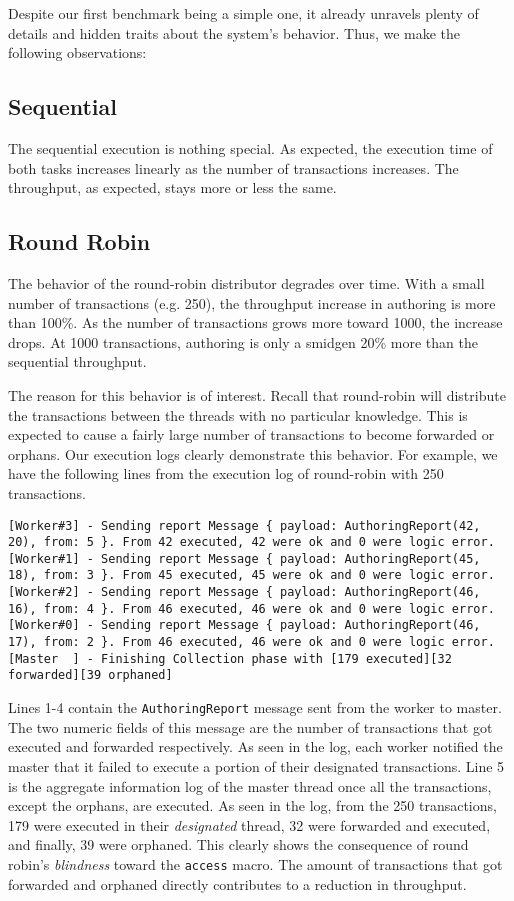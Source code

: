 Despite our first benchmark being a simple one, it already unravels plenty of details and
hidden traits about the system's behavior. Thus, we make the following observations:

\subsection*{Sequential}
The sequential execution is nothing special. As expected, the execution time of both tasks
increases linearly as the number of transactions increases. The throughput, as expected, stays
more or less the same.


\subsection*{Round Robin}
The behavior of the round-robin distributor degrades over time. With a small number of transactions
(e.g. 250), the throughput increase in authoring is more than 100\%. As the number of transactions
grows more toward 1000, the increase drops. At 1000 transactions, authoring is only a smidgen 20\%
more than the sequential throughput.

The reason for this behavior is of interest. Recall that round-robin will distribute the
transactions between the threads with no particular knowledge. This is expected to cause a fairly
large number of transactions to become forwarded or orphans. Our execution logs clearly demonstrate
this behavior. For example, we have the following lines from the execution log of round-robin with
250 transactions.

\begin{lstlisting}
[Worker#3] - Sending report Message { payload: AuthoringReport(42, 20), from: 5 }. From 42 executed, 42 were ok and 0 were logic error.
[Worker#1] - Sending report Message { payload: AuthoringReport(45, 18), from: 3 }. From 45 executed, 45 were ok and 0 were logic error.
[Worker#2] - Sending report Message { payload: AuthoringReport(46, 16), from: 4 }. From 46 executed, 46 were ok and 0 were logic error.
[Worker#0] - Sending report Message { payload: AuthoringReport(46, 17), from: 2 }. From 46 executed, 46 were ok and 0 were logic error.
[Master  ] - Finishing Collection phase with [179 executed][32 forwarded][39 orphaned]
\end{lstlisting}

Lines 1-4 contain the \texttt{AuthoringReport} message sent from the worker to master. The two
numeric fields of this message are the number of transactions that got executed and forwarded
respectively. As seen in the log, each worker notified the master that it failed to execute a
portion of their designated transactions. Line 5 is the aggregate information log of the master
thread once all the transactions, except the orphans, are executed. As seen in the log, from the 250
transactions, 179 were executed in their \textit{designated} thread, 32 were forwarded and executed,
and finally, 39 were orphaned. This clearly shows the consequence of round robin's \textit{blindness}
toward the \texttt{access} macro. The amount of transactions that got forwarded and orphaned
directly contributes to a reduction in throughput.

